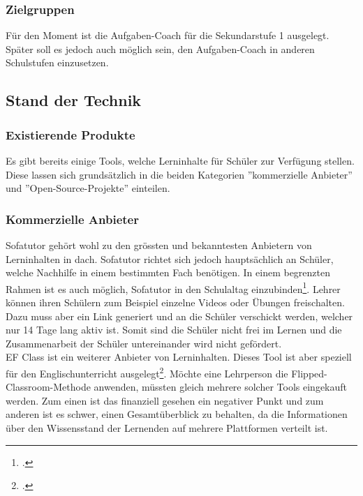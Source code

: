 \subsubsection{Zielgruppen}
Für den Moment ist die Aufgaben-Coach für die Sekundarstufe 1 ausgelegt. Später soll es jedoch auch möglich sein, den Aufgaben-Coach in anderen Schulstufen einzusetzen.

\subsection{Stand der Technik}
\subsubsection{Existierende Produkte}
Es gibt bereits einige Tools, welche Lerninhalte für Schüler zur Verfügung stellen. Diese lassen sich grundsätzlich in die beiden Kategorien ''kommerzielle Anbieter'' und ''Open-Source-Projekte'' einteilen.

\subsubsection*{Kommerzielle Anbieter}
Sofatutor gehört wohl zu den grössten und bekanntesten Anbietern von Lerninhalten in \gls{dach}. Sofatutor richtet sich jedoch hauptsächlich an Schüler, welche Nachhilfe in einem bestimmten Fach benötigen. In einem begrenzten Rahmen ist es auch möglich, Sofatutor in den Schulaltag einzubinden\footcite{sofatutor_fuer_lehrer}. Lehrer können ihren Schülern zum Beispiel einzelne Videos oder Übungen freischalten. Dazu muss aber ein Link generiert und an die Schüler verschickt werden, welcher nur 14 Tage lang aktiv ist. Somit sind die Schüler nicht frei im Lernen und die Zusammenarbeit der Schüler untereinander wird nicht gefördert.\\

EF Class ist ein weiterer Anbieter von Lerninhalten. Dieses Tool ist aber speziell für den Englischunterricht ausgelegt\footcite{ef_class_homepage}. Möchte eine Lehrperson die Flipped-Classroom-Methode anwenden, müssten gleich mehrere solcher Tools eingekauft werden. Zum einen ist das finanziell gesehen ein negativer Punkt und zum anderen ist es schwer, einen Gesamtüberblick zu behalten, da die Informationen über den Wissensstand der Lernenden auf mehrere Plattformen verteilt ist.


